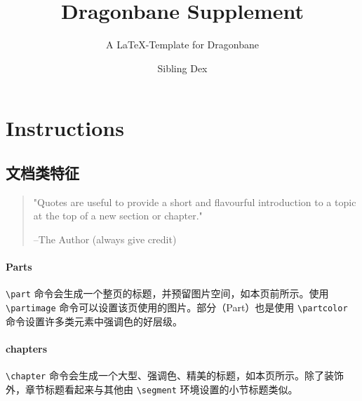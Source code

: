 \documentclass[
]{dragonbane-supplement}
\title{Dragonbane Supplement}
\subtitle{A LaTeX-Template for Dragonbane}
\author{Sibling Dex}
\begin{document}
\maketitle

\part{Instructions}

\chapter{文档类特征}

\begin{segment}

\begin{quote}
    "Quotes are useful to provide a short and flavourful introduction to a topic at the top of a new section or chapter."

    --The Author (always give credit)
\end{quote}

\subsection{Parts}
\texttt{\textbackslash part} 命令会生成一个整页的标题，并预留图片空间，如本页前所示。使用 \texttt{\textbackslash partimage} 命令可以设置该页使用的图片。部分（Part）也是使用 \texttt{\textbackslash partcolor} 命令设置许多类元素中强调色的好层级。

\subsection{chapters}
\texttt{\textbackslash chapter} 命令会生成一个大型、强调色、精美的标题，如本页所示。除了装饰外，章节标题看起来与其他由 \texttt{\textbackslash segment} 环境设置的小节标题类似。

\end{segment}
\end{document}
